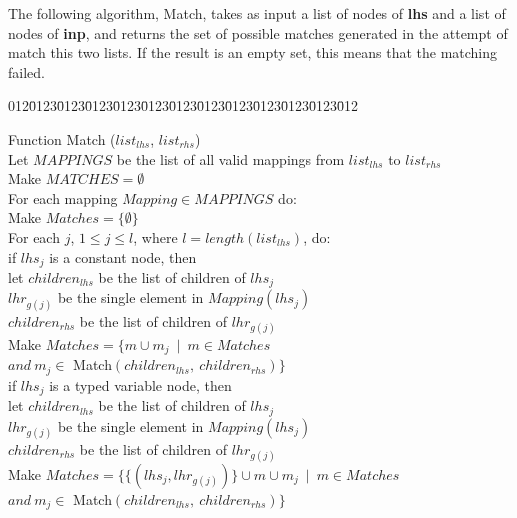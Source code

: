 The following algorithm, Match, takes as input a list of nodes of {\bf lhs}
and a list of nodes of {\bf inp}, and returns the set of possible matches
generated in the attempt of match this two lists. If the result is an empty
set, this means that the matching failed.

\begin{tabbing}
012\=0123\=0123\=0123\=0123\=0123\=0123\=0123\=0123\=0123\=0123\=0123\=012\kill

\> Function Match ($list_{lhs}$, $list_{rhs}$) \\
\>\> Let $MAPPINGS$ be the list of all valid mappings from $list_{lhs}$ to 
        $list_{rhs}$ \\

\>\> Make $MATCHES=\emptyset$ \\

\>\> For each mapping $Mapping\in MAPPINGS$ do: \\

\>\>\> Make $Matches=\{\emptyset \}$ \\

\>\>\> For each $j$, $1 \leq j \leq l$, where $l=length(list_{lhs})$, do: \\

\>\>\>\> if $lhs_j$ is a constant node, then \\

\>\>\>\>\> let \>$children_{lhs}$ be the list of children of $lhs_j$ \\
\>\>\>\>\>     \>$lhr_{g(j)}$ be the single element in $Mapping(lhs_j)$ \\
\>\>\>\>\>     \>$children_{rhs}$ be the list of children of $lhr_{g(j)}$ \\

\>\>\>\>\> Make $Matches=\{m\cup m_j\ \mid\  m\in Matches$ \\
\>\>\>\>\>\>\>\>\> $and\ m_j\in$ Match$(children_{lhs},\ children_{rhs})\}$ \\ 

\>\>\>\> if $lhs_j$ is a typed variable node, then \\

\>\>\>\>\> let \>$children_{lhs}$ be the list of children of $lhs_j$ \\
\>\>\>\>\>     \>$lhr_{g(j)}$ be the single element in $Mapping(lhs_j)$ \\
\>\>\>\>\>     \>$children_{rhs}$ be the list of children of $lhr_{g(j)}$ \\

\>\>\>\>\> Make $Matches=\{\{(lhs_j,lhr_{g(j)})\}\cup
        m\cup m_j\ \mid\  m\in Matches$ \\
\>\>\>\>\>\>\>\>\> $and\ m_j\in$ Match$(children_{lhs},\ children_{rhs})\}$ \\ 


\end{tabbing}
